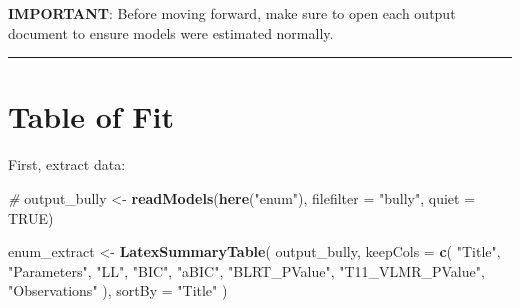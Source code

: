 \documentclass[
]{book}
\newenvironment{Shaded}{\begin{snugshade}}{\end{snugshade}}
\newcommand{\AttributeTok}[1]{\textcolor[rgb]{0.13,0.29,0.53}{#1}}
\newcommand{\CommentTok}[1]{\textcolor[rgb]{0.56,0.35,0.01}{\textit{#1}}}
\newcommand{\ConstantTok}[1]{\textcolor[rgb]{0.56,0.35,0.01}{#1}}
\newcommand{\FunctionTok}[1]{\textcolor[rgb]{0.13,0.29,0.53}{\textbf{#1}}}
\newcommand{\NormalTok}[1]{#1}
\newcommand{\OtherTok}[1]{\textcolor[rgb]{0.56,0.35,0.01}{#1}}
\newcommand{\StringTok}[1]{\textcolor[rgb]{0.31,0.60,0.02}{#1}}
\begin{document}
\textbf{IMPORTANT}: Before moving forward, make sure to open each output document to ensure models were estimated normally.

\begin{center}\rule{0.5\linewidth}{0.5pt}\end{center}

\section{Table of Fit}\label{table-of-fit}

First, extract data:

\begin{Shaded}
\begin{Highlighting}[]
\CommentTok{\# }
\NormalTok{output\_bully }\OtherTok{\textless{}{-}} \FunctionTok{readModels}\NormalTok{(}\FunctionTok{here}\NormalTok{(}\StringTok{"enum"}\NormalTok{), }\AttributeTok{filefilter =} \StringTok{"bully"}\NormalTok{, }\AttributeTok{quiet =} \ConstantTok{TRUE}\NormalTok{)}

\NormalTok{enum\_extract }\OtherTok{\textless{}{-}} \FunctionTok{LatexSummaryTable}\NormalTok{(}
\NormalTok{  output\_bully,}
  \AttributeTok{keepCols =} \FunctionTok{c}\NormalTok{(}
    \StringTok{"Title"}\NormalTok{,}
    \StringTok{"Parameters"}\NormalTok{,}
    \StringTok{"LL"}\NormalTok{,}
    \StringTok{"BIC"}\NormalTok{,}
    \StringTok{"aBIC"}\NormalTok{,}
    \StringTok{"BLRT\_PValue"}\NormalTok{,}
    \StringTok{"T11\_VLMR\_PValue"}\NormalTok{,}
    \StringTok{"Observations"}
\NormalTok{  ),}
  \AttributeTok{sortBy =} \StringTok{"Title"}
\NormalTok{) }



\end{Highlighting}
\end{Shaded}
\end{document}
